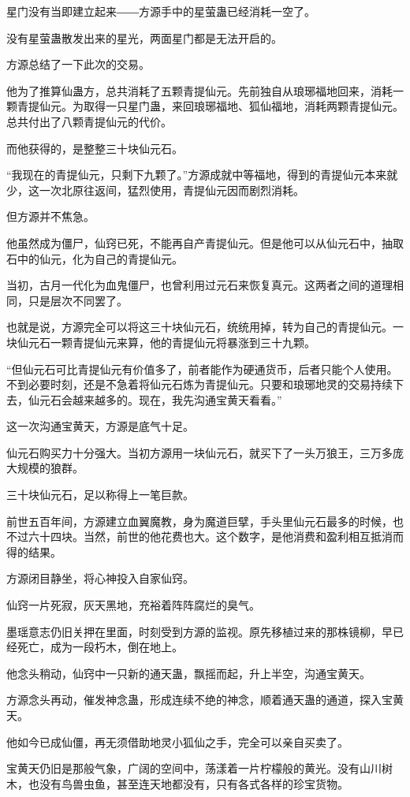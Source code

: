 \begin{this_body}
星门没有当即建立起来――方源手中的星萤蛊已经消耗一空了。

没有星萤蛊散发出来的星光，两面星门都是无法开启的。

方源总结了一下此次的交易。

他为了推算仙蛊方，总共消耗了五颗青提仙元。先前独自从琅琊福地回来，消耗一颗青提仙元。为取得一只星门蛊，来回琅琊福地、狐仙福地，消耗两颗青提仙元。总共付出了八颗青提仙元的代价。

而他获得的，是整整三十块仙元石。

“我现在的青提仙元，只剩下九颗了。”方源成就中等福地，得到的青提仙元本来就少，这一次北原往返间，猛烈使用，青提仙元因而剧烈消耗。

但方源并不焦急。

他虽然成为僵尸，仙窍已死，不能再自产青提仙元。但是他可以从仙元石中，抽取石中的仙元，化为自己的青提仙元。

当初，古月一代化为血鬼僵尸，也曾利用过元石来恢复真元。这两者之间的道理相同，只是层次不同罢了。

也就是说，方源完全可以将这三十块仙元石，统统用掉，转为自己的青提仙元。一块仙元石一颗青提仙元来算，他的青提仙元将暴涨到三十九颗。

“但仙元石可比青提仙元有价值多了，前者能作为硬通货币，后者只能个人使用。不到必要时刻，还是不急着将仙元石炼为青提仙元。只要和琅琊地灵的交易持续下去，仙元石会越来越多的。现在，我先沟通宝黄天看看。”

这一次沟通宝黄天，方源是底气十足。

仙元石购买力十分强大。当初方源用一块仙元石，就买下了一头万狼王，三万多庞大规模的狼群。

三十块仙元石，足以称得上一笔巨款。

前世五百年间，方源建立血翼魔教，身为魔道巨擘，手头里仙元石最多的时候，也不过六十四块。当然，前世的他花费也大。这个数字，是他消费和盈利相互抵消而得的结果。

方源闭目静坐，将心神投入自家仙窍。

仙窍一片死寂，灰天黑地，充裕着阵阵腐烂的臭气。

墨瑶意志仍旧关押在里面，时刻受到方源的监视。原先移植过来的那株镜柳，早已经死亡，成为一段朽木，倒在地上。

他念头稍动，仙窍中一只新的通天蛊，飘摇而起，升上半空，沟通宝黄天。

方源念头再动，催发神念蛊，形成连续不绝的神念，顺着通天蛊的通道，探入宝黄天。

他如今已成仙僵，再无须借助地灵小狐仙之手，完全可以亲自买卖了。

宝黄天仍旧是那般气象，广阔的空间中，荡漾着一片柠檬般的黄光。没有山川树木，也没有鸟兽虫鱼，甚至连天地都没有，只有各式各样的珍宝货物。


\end{this_body}
